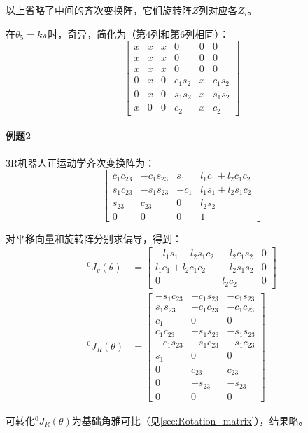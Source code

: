 \documentclass[
12pt, %
a4paper, 
oneside, %
headinclude,footinclude, %
]{scrartcl}
\begin{document}
{以上省略了中间的齐次变换阵，它们旋转阵$ Z $列对应各$ Z_i $。

在$ \theta_5 = k\pi $时，奇异，简化为（第4列和第6列相同）：
$$
\begin{bmatrix}
x & x & x& 0 & 0 & 0 \\
x & x & x & 0 & 0 & 0 \\
x & x & x& 0 & 0 & 0 \\
0 & x & 0 & c_1 s_2 & x & c_1 s_2 \\
0 & x & 0 & s_1 s_2 & x & s_1 s_2 \\
x & 0 & 0 & c_2 & x& c_2
\end{bmatrix}
$$
}
\paragraph{例题2}\label{sec:example4.2}
{\footnotesize
3R机器人正运动学齐次变换阵为：
$$ \begin{bmatrix} c_1c_{23} & -c_1s_{23} & s_1 & l_1c_1 + l_2c_1c_2 \\ s_1c_{23} & -s_1s_{23} & -c_1 & l_1s_1 + l_2s_1c_2 \\ s_{23} & c_{23} & 0 & l_2s_2 \\ 0 & 0 & 0 & 1 \end{bmatrix} $$

对平移向量和旋转阵分别求偏导，得到：
\begin{align*}
^0J_v(\theta) &= \begin{bmatrix} -l_1s_1 - l_2s_1c_2 & -l_2c_1s_2 & 0 \\ l_1c_1 + l_2c_1c_2 & -l_2s_1s_2 & 0 \\ 0 & l_2c_2 & 0 \end{bmatrix} \\
^0J_R(\theta) &= \begin{bmatrix}
-s_1c_{23} & -c_1s_{23} & -c_1s_{23} \\ s_1s_{23} & -c_1c_{23} & -c_1c_{23} \\ c_1 & 0 & 0 \\
c_1c_{23} & -s_1s_{23} & -s_1s_{23} \\ -c_1s_{23} & -s_1c_{23} & -s_1c_{23} \\ s_1 & 0 & 0 \\
0 & c_{23} & c_{23} \\ 0 & -s_{23} & -s_{23} \\ 0 & 0 & 0
\end{bmatrix}
\end{align*}

可转化$ ^0J_R(\theta) $为基础角雅可比（见\ref{sec:Rotation_matrix}），结果略。
}
\end{document}
